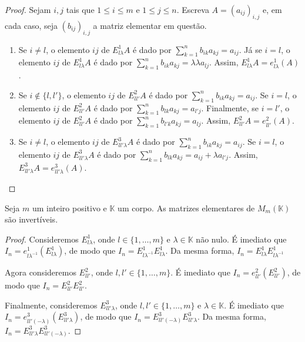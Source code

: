 \begin{definition}
        \begin{proof}
            Sejam $i, j$ tais que $1\leq i \leq m$ e $1\leq j \leq n$.
            Escreva $A=(a_{ij})_{i, j}$ e, em cada caso, seja $(b_{ij})_{i, j}$ a matriz elementar em questão.
            \begin{enumerate}
                \item Se $i\neq l$, o elemento $ij$ de $E_{l\lambda}^1 A$ é dado por $\sum_{k=1}^n b_{ik}a_{kj}=a_{ij}$.
                Já se $i=l$, o elemento $ij$ de $E_{l\lambda}^1 A$ é dado por $\sum_{k=1}^n b_{ik}a_{kj}=\lambda \lambda a_{lj}$.
                Assim, $E_{l\lambda}^1 A = e_{l\lambda}^1(A)$.
                \item Se $i\notin\{l, l'\}$, o elemento $ij$ de $E_{l l'}^2 A$ é dado por $\sum_{k=1}^n b_{ik}a_{kj}=a_{ij}$.
                Se $i=l$, o elemento $ij$ de $E_{l l'}^2 A$ é dado por $\sum_{k=1}^n b_{lk}a_{kj}=a_{l'j}$.
                Finalmente, se $i=l'$, o elemento $ij$ de $E_{l l'}^2 A$ é dado por $\sum_{k=1}^n b_{l'k}a_{kj}=a_{lj}$.
                Assim, $E_{l l'}^2 A = e_{l l'}^2(A)$.
                \item Se $i\neq l$, o elemento $ij$ de $E_{l l'\lambda}^3 A$ é dado por $\sum_{k=1}^n b_{ik}a_{kj}=a_{ij}$.
                Se $i=l$, o elemento $ij$ de $E_{l l'\lambda}^3 A$ é dado por $\sum_{k=1}^n b_{lk}a_{kj}=a_{ij}+\lambda a_{l'j}$.
                Assim, $E_{l l'\lambda}^3 A = e_{l l'\lambda}^3(A)$.
            \end{enumerate}
        \end{proof}
\end{definition}

\begin{lemma}
    Seja $m$ um inteiro positivo e $\mathbb K$ um corpo. As matrizes elementares de $M_{m}(\mathbb K)$ são invertíveis.
\end{lemma}
\begin{proof}
    Consideremos $E_{l\lambda}^1$, onde $l\in \{1, \ldots, m\}$ e $\lambda \in \mathbb K$ não nulo. É imediato que $I_n=e_{l\lambda^{-1}}^1(E_{l\lambda}^1)$, de modo que $I_n=E_{l\lambda^{-1}}^1 E_{l\lambda}^1$.
    Da mesma forma, $I_n=E_{l\lambda}^1 E_{l\lambda^{-1}}^1$

    Agora consideremos $E_{l l'}^2$, onde $l, l'\in \{1, \ldots, m\}$. É imediato que $I_n=e_{l l'}^2(E_{l l'}^2)$, de modo que $I_n=E_{l l'}^2 E_{l l'}^2$.

    Finalmente, consideremos $E_{l l'\lambda}^3$, onde $l, l'\in \{1, \ldots, m\}$ e $\lambda \in \mathbb K$. É imediato que $I_n=e_{l l'(-\lambda)}^3(E_{l l'\lambda}^3)$, de modo que $I_n=E_{l l'(-\lambda)}^3 E_{l l'\lambda}^3$.
    Da mesma forma, $I_n=E_{l l'\lambda}^3 E_{l l'(-\lambda)}^3$.
\end{proof}

